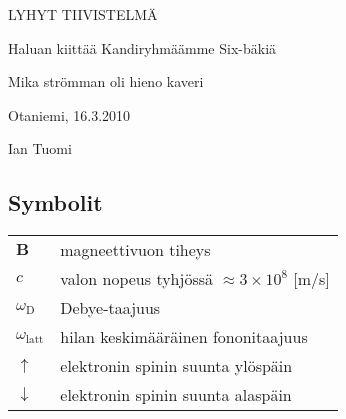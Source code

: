\documentclass[finnish,12pt]{article}
\begin{document}

	\author{Ian Tuomi}
	\date{5.12.2012}
	\makecoverpage

	\begin{abstractpage}[finnish]
  
LYHYT TIIVISTELMÄ
  
	\end{abstractpage}

	\newpage


Haluan kiittää Kandiryhmäämme Six-bäkiä

Mika strömman oli hieno kaveri \\

	\vspace{5cm}

Otaniemi, 16.3.2010

	\vspace{5mm}
	{\hfill Ian Tuomi \hspace{1cm}}

	\newpage

	\tableofcontents


	\subsection*{Symbolit}

	\begin{tabular}{ll}
	$\mathbf{B}$  & magneettivuon tiheys  \\
	$c$              & valon nopeus tyhjössä $\approx 3\times10^8$ [m/s]\\
	$\omega_{\mathrm{D}}$    & Debye-taajuus \\
	$\omega_{\mathrm{latt}}$ & hilan keskimääräinen fononitaajuus \\
	$\uparrow$       & elektronin spinin suunta ylöspäin\\
	$\downarrow$     & elektronin spinin suunta alaspäin
	\end{tabular}
\end{document}
